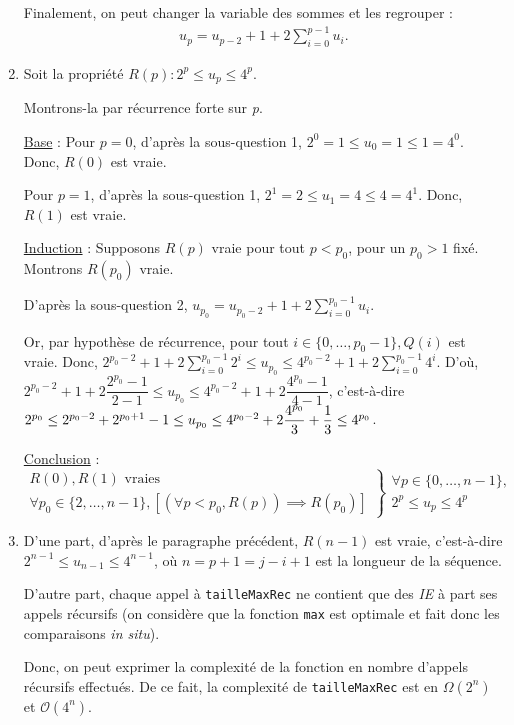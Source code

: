 \documentclass[12pt,a4paper]{article}
\begin{document}
\begin{enumerate}
	Finalement, on peut changer la variable des sommes et les regrouper : 
	\begin{gather*}
	u_p=u_{p-2}+1+2\sum_{i=0}^{p-1}{u_{i}}.
	\tag*{$\square$}
	\end{gather*}
	
	\item Soit la propri\'et\'e \( R(p): 2^p \leq u_p \leq 4^p \). 
	
	Montrons-la par r\'ecurrence forte sur {\itshape p}.
	
	\underline{Base} : Pour \( p = 0\), d'apr\`es la sous-question 1, \( 2^0 = 1 \leq u_0 = 1 \leq 1 = 4^0 \). Donc, \( R(0) \) est vraie.
	
	Pour \( p = 1\), d'apr\`es la sous-question 1, \( 2^1 = 2 \leq u_1 = 4 \leq 4 = 4^1 \). Donc, \( R(1) \) est vraie.
	
	\underline{Induction} : Supposons \( R(p) \) vraie pour tout \( p < p_0 \), pour un \( p_0 > 1 \) fix\'e. Montrons \( R(p_0) \) vraie.
	
	D'apr\`es la sous-question 2, \( u_{p_0} = u_{p_0-2} + 1 + 2\sum_{i=0}^{p_0-1}{u_i} \). 
	
	Or, par hypoth\`ese de r\'ecurrence, pour tout \( i \in \{0,\dotsc,p_0-1 \}, Q(i) \) est vraie. Donc, \( 2^{p_0-2} + 1 + 2\sum_{i=0}^{p_0-1}{2^i} \leq u_{p_0} \leq 4^{p_0-2} + 1 + 2\sum_{i=0}^{p_0-1}{4^i} \). D'o\`u, \( 2^{p_0-2} + 1 + 2\dfrac{2^{p_0}-1}{2-1} \leq u_{p_0} \leq 4^{p_0-2} + 1 + 2\dfrac{4^{p_0}-1}{4-1} \), c'est-\`a-dire \(\\ 2^{p_0} \leq 2^{p_0-2} + 2^{p_0+1} - 1 \leq u_{p_0} \leq 4^{p_0-2} + 2\dfrac{4^{p_0}}{3} + \dfrac{1}{3} \leq 4^{p_0}  \).
	
	\underline{Conclusion} : 
	\begin{equation*}
\left .\begin{array}{l}
R(0), R(1) \text{ vraies } \\
\forall p_0 \in \{2,\dotsc, n-1\}, [(\forall p < p_0, R(p)) \implies R(p_0) ]
\end{array} \right \}
\left .\begin{array}{l}
\forall p \in \{0,\dotsc, n-1\}, \\
2^p \leq u_p \leq 4^p
\end{array}\right .
\end{equation*}

\item D'une part, d'apr\`es le paragraphe pr\'ec\'edent, $R(n-1)$ est vraie, c'est-\`a-dire \( 2^{n-1} \leq u_{n-1} \leq 4^{n-1} \), o\`u \( n = p+1=j-i+1 \) est la longueur de la s\'equence. 

D'autre part, chaque appel \`a \texttt{tailleMaxRec} ne contient que des {\itshape IE} \`a part ses appels r\'ecursifs (on consid\`ere que la fonction \texttt{max} est optimale et fait donc les comparaisons {\itshape in situ}).

Donc, on peut exprimer la complexit\'e de la fonction en nombre d'appels r\'ecursifs effectu\'es. De ce fait, la complexit\'e de \texttt{tailleMaxRec} est en $\Omega(2^n)$ et $\mathcal{O}(4^n)$.
\end{enumerate}
\end{document}
